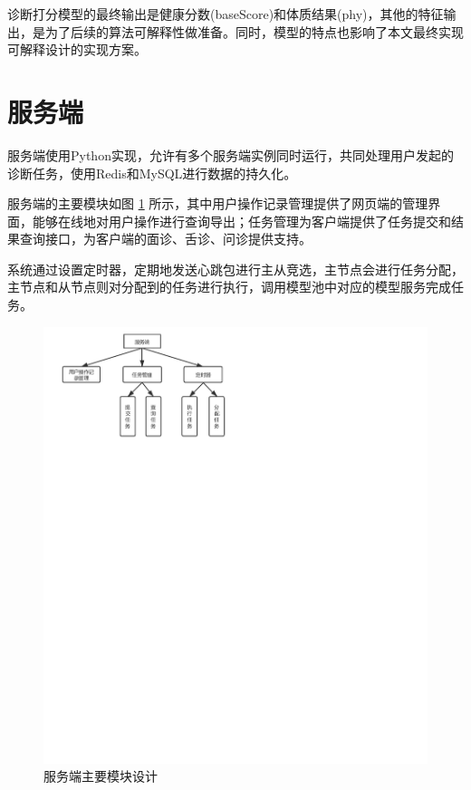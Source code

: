 诊断打分模型的最终输出是健康分数(baseScore)和体质结果(phy)，其他的特征输出，是为了后续的算法可解释性做准备。同时，模型的特点也影响了本文最终实现可解释设计的实现方案。


\section{服务端}

服务端使用Python实现，允许有多个服务端实例同时运行，共同处理用户发起的诊断任务，使用Redis和MySQL进行数据的持久化。

服务端的主要模块如图 \ref{fig:server} 所示，其中用户操作记录管理提供了网页端的管理界面，能够在线地对用户操作进行查询导出；任务管理为客户端提供了任务提交和结果查询接口，为客户端的面诊、舌诊、问诊提供支持。

系统通过设置定时器，定期地发送心跳包进行主从竞选，主节点会进行任务分配，主节点和从节点则对分配到的任务进行执行，调用模型池中对应的模型服务完成任务。


\begin{figure}[ht]
    \centering
    \includegraphics[width=15cm]{images/server.pdf}
    \caption{服务端主要模块设计}
    \label{fig:server}
\end{figure}


